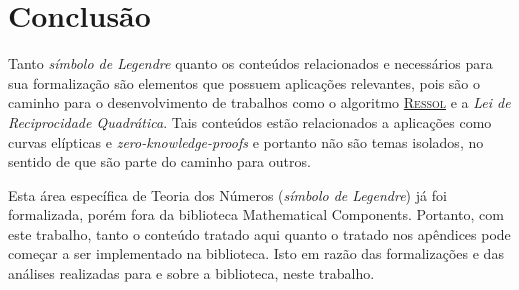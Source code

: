 \chapter{Conclusão}
\label{cap:conclusao}

Tanto \textit{símbolo de Legendre} quanto os conteúdos relacionados e necessários para sua formalização são elementos que possuem aplicações relevantes, pois são o caminho para o desenvolvimento de trabalhos como o algoritmo \hyperref[algo:ressol]{\textsc{Ressol}} e a \textit{Lei de Reciprocidade Quadrática}. Tais conteúdos estão relacionados a aplicações como curvas elípticas  e \textit{zero-knowledge-proofs} e portanto não são temas isolados, no sentido de que são parte do caminho para outros.

Esta área específica de Teoria dos Números (\textit{símbolo de Legendre}) já foi formalizada, porém fora da biblioteca Mathematical Components. Portanto, com este trabalho, tanto o conteúdo tratado aqui quanto o tratado nos apêndices pode começar a ser implementado na biblioteca. Isto em razão das formalizações e das análises realizadas para e sobre a biblioteca, neste trabalho.  



